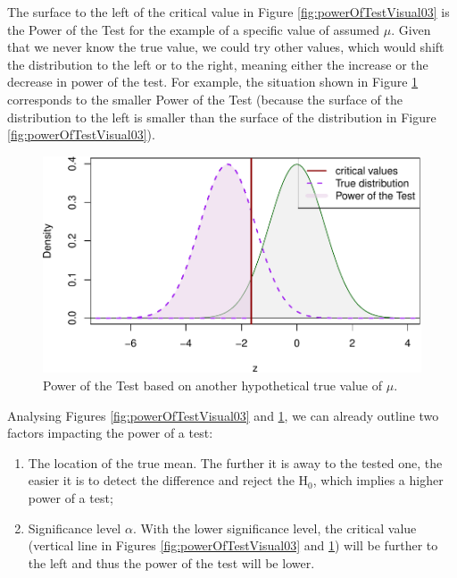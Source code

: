 \documentclass[
]{book}
\providecommand{\tightlist}{%
  \setlength{\itemsep}{0pt}\setlength{\parskip}{0pt}}
\theoremstyle{definition}
\theoremstyle{definition}
\theoremstyle{definition}
\theoremstyle{definition}
\theoremstyle{remark}
\begin{document}
The surface to the left of the critical value in Figure \ref{fig:powerOfTestVisual03} is the Power of the Test for the example of a specific value of assumed \(\mu\). Given that we never know the true value, we could try other values, which would shift the distribution to the left or to the right, meaning either the increase or the decrease in power of the test. For example, the situation shown in Figure \ref{fig:powerOfTestVisual04} corresponds to the smaller Power of the Test (because the surface of the distribution to the left is smaller than the surface of the distribution in Figure \ref{fig:powerOfTestVisual03}).

\begin{figure}
\centering
\includegraphics{Svetunkov---Statistics-for-Business-Analytics_files/figure-latex/powerOfTestVisual04-1.pdf}
\caption{\label{fig:powerOfTestVisual04}Power of the Test based on another hypothetical true value of \(\mu\).}
\end{figure}

Analysing Figures \ref{fig:powerOfTestVisual03} and \ref{fig:powerOfTestVisual04}, we can already outline two factors impacting the power of a test:

\begin{enumerate}
\def\labelenumi{\arabic{enumi}.}
\tightlist
\item
  The location of the true mean. The further it is away to the tested one, the easier it is to detect the difference and reject the H\(_0\), which implies a higher power of a test;
\item
  Significance level \(\alpha\). With the lower significance level, the critical value (vertical line in Figures \ref{fig:powerOfTestVisual03} and \ref{fig:powerOfTestVisual04}) will be further to the left and thus the power of the test will be lower.
\end{enumerate}
\end{document}
